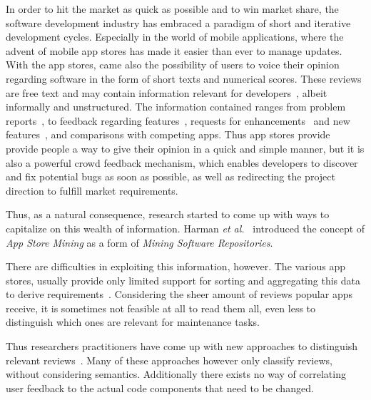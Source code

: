 In order to hit the market as quick as possible and to win market share, the software development industry has embraced a paradigm of short and iterative development cycles. Especially in the world of mobile applications, where the advent of mobile app stores has made it easier than ever to manage updates. With the app stores, came also the possibility of users to voice their opinion regarding software in the form of short texts and numerical scores. These reviews are free text and may contain information relevant for developers~\cite{inukollu2014factors}, albeit informally and unstructured. The information contained ranges from problem reports~\cite{Pagano:2013:RE}, to feedback regarding features~\cite{Guzman:2014:RE}, requests for enhancements~\cite{iacob2013retrieving} and new features~\cite{Pagano:2013:RE,galvis2013analysis}, and comparisons with competing apps.
Thus app stores provide provide people a way to give their opinion in a quick and simple manner, but it is also a powerful crowd feedback mechanism, which enables developers to discover and fix potential bugs as soon as possible, as well as redirecting the project direction to fulfill market requirements.

Thus, as a natural consequence, research started to come up with ways to capitalize on this wealth of information. Harman \textit{et al.}~\cite{Harman:MSR:2012} introduced the concept of \textit{App Store Mining} as a form of \textit{Mining Software Repositories}.

There are difficulties in exploiting this information, however. The various app stores, usually provide only limited support for sorting and aggregating this data to derive requirements~\cite{abelein2013does}. Considering the sheer amount of reviews popular apps receive, it is sometimes not feasible at all to read them all, even less to distinguish which ones are relevant for maintenance tasks.

Thus researchers practitioners have come up with new approaches to distinguish relevant reviews~\cite{iacob2013retrieving,panichella2015can,oh2013facilitating}. Many of these approaches however only classify reviews, without considering semantics. Additionally there exists no way of correlating user feedback to the actual code components that need to be changed.